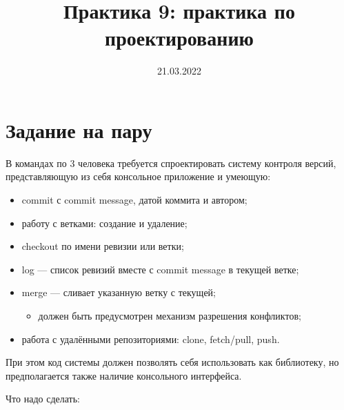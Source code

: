 \documentclass[a5paper]{article}
\title{Практика 9: практика по проектированию}
\author{}
\date{21.03.2022}
\begin{document}
\maketitle
\thispagestyle{empty}

\section{Задание на пару}

В командах по 3 человека требуется спроектировать систему контроля версий, представляющую из себя консольное приложение и умеющую:

\begin{itemize}
    \item commit с commit message, датой коммита и автором;
    \item работу с ветками: создание и удаление;
    \item checkout по имени ревизии или ветки;
    \item log --- список ревизий вместе с commit message в текущей ветке;
    \item merge --- сливает указанную ветку с текущей;
    \begin{itemize}
        \item должен быть предусмотрен механизм разрешения конфликтов;
    \end{itemize}
    \item работа с удалёнными репозиториями: clone, fetch/pull, push.
\end{itemize}

При этом код системы должен позволять себя использовать как библиотеку, но предполагается также наличие консольного интерфейса.

Что надо сделать:
\end{document}

